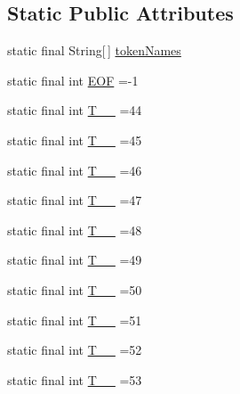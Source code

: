 \subsection*{Static Public Attributes}
\begin{DoxyCompactItemize}
\item 
static final String\mbox{[}$\,$\mbox{]} \hyperlink{classorg_1_1tzi_1_1use_1_1parser_1_1shell_1_1_shell_command_parser_ab633eb8fe32a7a3abb9edfa57b9b2bf3}{token\-Names}
\item 
static final int \hyperlink{classorg_1_1tzi_1_1use_1_1parser_1_1shell_1_1_shell_command_parser_aa0b629f163714808a4ee8750266c1aa5}{E\-O\-F} =-\/1
\item 
static final int \hyperlink{classorg_1_1tzi_1_1use_1_1parser_1_1shell_1_1_shell_command_parser_a2759d393fe3ded6de578ed70fb8ec06c}{T\-\_\-\-\_} =44
\item 
static final int \hyperlink{classorg_1_1tzi_1_1use_1_1parser_1_1shell_1_1_shell_command_parser_a9cca9336f57f1d6b38f737138c0e1a79}{T\-\_\-\-\_} =45
\item 
static final int \hyperlink{classorg_1_1tzi_1_1use_1_1parser_1_1shell_1_1_shell_command_parser_a980ed0fd0e061347b0d51bbcea4fc350}{T\-\_\-\-\_} =46
\item 
static final int \hyperlink{classorg_1_1tzi_1_1use_1_1parser_1_1shell_1_1_shell_command_parser_a6f50986cde5fc1efc3831f43f1f8a063}{T\-\_\-\-\_} =47
\item 
static final int \hyperlink{classorg_1_1tzi_1_1use_1_1parser_1_1shell_1_1_shell_command_parser_a9ca73018c51d76fc6eacfdec4527d91a}{T\-\_\-\-\_} =48
\item 
static final int \hyperlink{classorg_1_1tzi_1_1use_1_1parser_1_1shell_1_1_shell_command_parser_a671f9238d5f37a2c2b80be36c274d2fb}{T\-\_\-\-\_} =49
\item 
static final int \hyperlink{classorg_1_1tzi_1_1use_1_1parser_1_1shell_1_1_shell_command_parser_afe0d72c3ce2dd83f53fcaab3ec31e126}{T\-\_\-\-\_} =50
\item 
static final int \hyperlink{classorg_1_1tzi_1_1use_1_1parser_1_1shell_1_1_shell_command_parser_a09a1d31138194fca6832712699356799}{T\-\_\-\-\_} =51
\item 
static final int \hyperlink{classorg_1_1tzi_1_1use_1_1parser_1_1shell_1_1_shell_command_parser_aacd6714a81147444041dc10152d30425}{T\-\_\-\-\_} =52
\item 
static final int \hyperlink{classorg_1_1tzi_1_1use_1_1parser_1_1shell_1_1_shell_command_parser_af3d1acb385202c4ef191cf2f9d807294}{T\-\_\-\-\_} =53

\end{DoxyCompactItemize}
